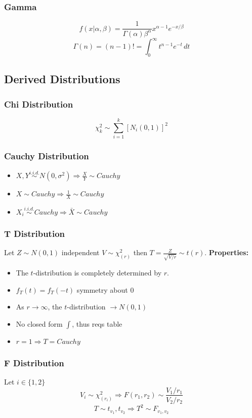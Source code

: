 	\subsubsection*{Gamma}
		\[f(x|\alpha,\beta) = \frac{1}{\Gamma(\alpha)\beta^\alpha}x^{\alpha-1}e^{-x/\beta}\]
		\[\Gamma(n) = (n-1)! = \int_{0}^{\infty}t^{n-1}e^{-t}\,dt\]
	
\subsection*{Derived Distributions}
	\subsubsection*{Chi Distribution}
		\[ \chi^2_k \sim \sum_{i=1}^{k} \left[N_i(0,1)\right]^2	\]
			
	\subsubsection*{Cauchy Distribution}
		\begin{itemize}
			\item \(X,Y \overset{i.i.d.}{\sim} N(0,\sigma^2) \Rightarrow \frac{X}{Y}\sim Cauchy\)
			\item \(X \sim Cauchy \Rightarrow \frac{1}{X}\sim Cauchy\)
			\item \(X_i \overset{i.i.d.}{\sim} Cauchy \Rightarrow \bar X \sim Cauchy\)
		\end{itemize}
	
	\subsubsection*{T Distribution}
		Let \(Z\sim N(0,1)\) independent \(V\sim\chi_{(r)}^2\) then \(T=\frac{Z}{\sqrt{V/r}}\sim t(r)\).
		\textbf{Properties:}
		\begin{itemize}
			\item The \(t\)-distribution is completely determined by \(r\).
			\item \(f_T(t)=f_T(-t)\) symmetry about \(0\)
			\item As \(r \rightarrow\infty\), the \(t\)-distribution \(\rightarrow N(0,1)\)
			\item No closed form \(\int\), thus reqs table
			\item \(r=1 \Rightarrow T = Cauchy\) 
		\end{itemize}
	
	\subsubsection*{F Distribution}
		Let \(i\in\{1,2\}\)
		\[ V_i\sim \chi^2_{(r_i)} \Rightarrow F(r_1,r_2)\sim\frac{V_1/r_1}{V_2/r_2}\]
		\[ T\sim t_{v_1},t_{v_2} \Rightarrow T^2\sim F_{v_1,v_2} \]
		
